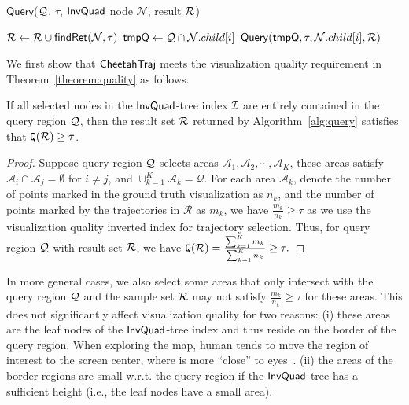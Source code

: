 \begin{algorithm}
	\caption{$\mathsf{Query}$($\mathcal{Q}$, $\tau$, $\mathsf{InvQuad}$ node $\mathcal{N}$, result $\mathcal{R}$)}
	\label{alg:query}
	\begin{algorithmic}[1]
            \State $\mathcal{R} \leftarrow \mathcal{R} \cup \mathsf{findRet}(\mathcal{N}, \tau)$ \label{line:ret}
         \label{line:valls}
                \State $\mathsf{tmpQ} \leftarrow \mathcal{Q} \cap \mathcal{N}.child[i]$
                \State $\mathsf{Query}(\mathsf{tmpQ}, \tau, \mathcal{N}.child[i], \mathcal{R})$
            \EndFor \label{line:valle}
        \EndIf
	\end{algorithmic}
\end{algorithm}


%

We first show that $\mathsf{CheetahTraj}$ meets the visualization quality requirement in Theorem~\ref{theorem:quality} as follows.
\begin{theorem}\label{theorem:quality}
If all selected nodes in the $\mathsf{InvQuad}$-tree index $\mathcal{I}$ are entirely contained in the query region $\mathcal{Q}$,
then the result set $\mathcal{R}$ returned by Algorithm~\ref{alg:query} satisfies that $\mathtt{Q}(\mathcal{R}) \ge \tau$.
\end{theorem}
\begin{proof}
Suppose query region $\mathcal{Q}$ selects areas $\mathcal{A}_1,\!\mathcal{A}_2,\!\cdots,\!\mathcal{A}_K$,
these areas satisfy $\mathcal{A}_i \cap \mathcal{A}_j = \emptyset$ for $i\neq j$, and $\cup_{k=1}^{K}\mathcal{A}_k=\mathcal{Q}$.
For each area $\mathcal{A}_k$, denote the number of points marked in the ground truth visualization as $n_k$,
and the number of points marked by the trajectories in $\mathcal{R}$ as $m_k$,
we have $\frac{m_k}{n_k} \ge \tau$ as we use the visualization quality inverted index for trajectory selection.
Thus, for query region $\mathcal{Q}$ with result set $\mathcal{R}$, we have
$\mathtt{Q}(\mathcal{R}) = \frac{\sum_{k=1}^{K} m_k}{\sum_{k=1}^{K} n_k} \ge \tau.$
\end{proof}
In more general cases, we also select some areas that only intersect with the query region $\mathcal{Q}$ and the sample set $\mathcal{R}$ may not satisfy $\frac{m_k}{n_k}\ge \tau$ for these areas.
This does not significantly affect visualization quality for two reasons:
(i) these areas are the leaf nodes of the $\mathsf{InvQuad}$-tree index and thus reside on the border of the query region.
When exploring the map, human tends to move the region of interest to the screen center, where is more ``close'' to eyes~\cite{fitts_click}. %
(ii) the areas of the border regions are small w.r.t. the query region if the $\mathsf{InvQuad}$-tree has a sufficient height (i.e., the leaf nodes have a small area).

